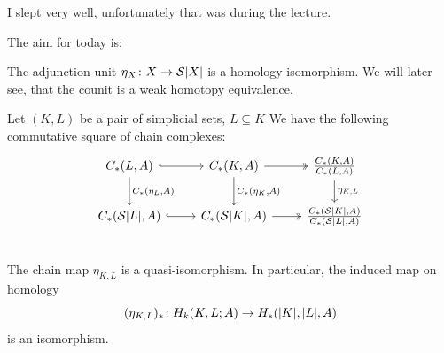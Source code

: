 \documentclass[language=english]{TemplateLecture}
\begin{document}
I slept very well, unfortunately that was during the lecture.


The aim for today is:



The adjunction unit \(\eta_X \colon X \to \mathcal{S}\lvert X\rvert\) is a homology isomorphism. We will later see, that the counit is a weak homotopy equivalence.

\begin{thm}{}{}
    Let \((K,L)\) be a pair of simplicial sets, \(L\subseteq K\) We have the following commutative square of chain complexes:
    \[\begin{tikzcd}
        {C_*(L,A)} \ar[r, hook] \ar[d, "{C_*(\eta_L, A)}"] & C_*(K,A) \ar[d, "{C_*(\eta_K, A)}"] \ar[r, two heads] & \frac{C_*(K,A)}{C_*(L,A)} \ar[d, "{\eta_{K,L}}"] \\
        {C_*(\cS\abs L, A)} \ar[r, hook] & {C_*(\cS\abs K, A)} \ar[r, two heads] & {\frac{C_*(\cS\abs K, A)}{C_*(\cS\abs L, A)}} \\
    \end{tikzcd}\]
    The chain map \(\eta_{K,L}\) is a quasi-isomorphism. In particular, the induced map on homology
    \[(\eta_{K,L})_*\colon H_k(K,L;A) \to H_*(\lvert K\rvert, \lvert L\rvert, A)\]
    is an isomorphism.
\end{thm}
\end{document}
